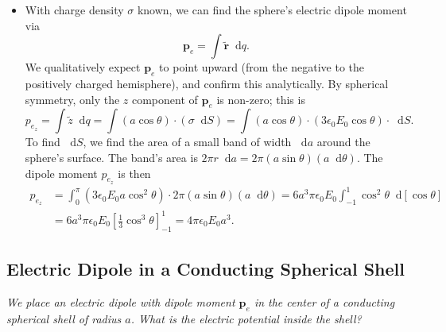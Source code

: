 \documentclass[11pt, a4paper]{article}
\newcommand{\diff}{\mathop{}\!\mathrm{d}} %
\renewcommand{\vec}[1]{\bm{#1}} %
\newcommand{\tvec}[1]{\tilde{\vec{#1}}} %
\newcommand{\ee}{\epsilon_{0}}  %
\newcommand{\pe}{\vec{p}_{e}}  %
\begin{document}
\begin{itemize}
	\item With charge density $ \sigma $ known, we can find the sphere's electric dipole moment via
	\begin{equation*}
		\vec{p}_{e} = \int \tvec{r} \diff q.
	\end{equation*}
	We qualitatively expect $ \vec{p}_{e} $ to point upward (from the negative to the positively charged hemisphere), and confirm this analytically. By spherical symmetry, only the $ z $ component of $ \vec{p}_{e} $ is non-zero; this is
	\begin{equation*}
		p_{e_{z}} = \int \tilde{z} \diff q = \int (a \cos \theta) \cdot (\sigma \diff S) = \int( a \cos \theta) \cdot (3 \ee E_{0} \cos \theta) \cdot \diff S.
	\end{equation*}
	To find $ \diff S $, we find the area of a small band of width $ \diff a $ around the sphere's surface. The band's area is $ 2\pi r \diff a = 2\pi (a \sin \theta ) (a \diff \theta) $. The dipole moment $ p_{e_{z}} $ is then
	\begin{align*}
		p_{e_{z}} &= \int_{0}^{\pi}(3\ee E_{0}a\cos^{2}\theta) \cdot 2\pi (a \sin \theta ) (a \diff \theta) = 6a^{3}\pi \ee E_{0} \int_{-1}^{1}\cos^{2}\theta \diff [\cos \theta]\\
		& = 6a^{3}\pi \ee E_{0} \left[\frac{1}{3}\cos^{3}\theta \right]_{-1}^{1} = 4\pi \ee E_{0} a^{3}.
	\end{align*}
\end{itemize}

\subsection{Electric Dipole in a Conducting Spherical Shell}
\textit{We place an electric dipole with dipole moment $ \pe $ in the center of a conducting spherical shell of radius $ a $. What is the electric potential inside the shell?}
\end{document}
